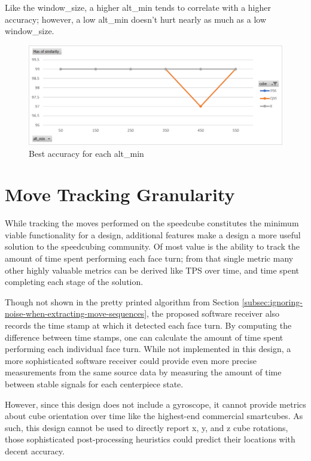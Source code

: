 Like the window\_size, a higher alt\_min tends to correlate with a
higher accuracy; however, a low alt\_min doesn't hurt nearly as much as
a low window\_size.

\begin{figure}[h]
    \centering
    \caption{Best accuracy for each alt\_min}
    \label{fig:max-similarity-by-alt-min}
    \includegraphics[width=0.75\linewidth]{Figures/7 Evaluation/max_similarity_by_alt_min.png}
\end{figure}


\section{Move Tracking Granularity}
\label{sec:move-tracking-granularity}

While tracking the moves performed on the speedcube constitutes the
minimum viable functionality for a design, additional features make a
design a more useful solution to the speedcubing community. Of most
value is the ability to track the amount of time spent performing each
face turn; from that single metric many other highly valuable metrics
can be derived like TPS over time, and time spent completing each stage
of the solution.

Though not shown in the pretty printed algorithm from Section
\ref{subsec:ignoring-noise-when-extracting-move-sequences}, the
proposed software receiver also records the time stamp at which it
detected each face turn. By computing the difference between time
stamps, one can calculate the amount of time spent performing each
individual face turn. While not implemented in this design, a more
sophisticated software receiver could provide even more precise
measurements from the same source data by measuring the amount of time
between stable signals for each centerpiece state.

However, since this design does not include a gyroscope, it cannot
provide metrics about cube orientation over time like the highest-end
commercial smartcubes. As such, this design cannot be used to directly
report x, y, and z cube rotations, those sophisticated post-processing
heuristics could predict their locations with decent accuracy.



